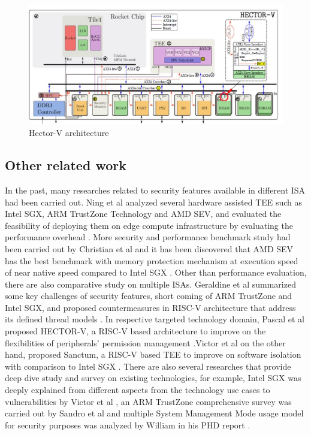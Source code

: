 \documentclass[]{rsos}%
\begin{document}
\begin{figure}[hbt!]
	\centering
	\includegraphics[width=1\textwidth]{figs/Hector.JPG}
	\caption{Hector-V architecture}
\end{figure}


\subsection{ Other related work}
In the past, many researches related to security features available in different ISA had been carried out.
Ning et al analyzed several hardware assisted TEE such as Intel SGX, ARM TrustZone Technology
and AMD SEV, and evaluated the feasibility of deploying them on edge compute infrastructure by evaluating the performance overhead \cite{R5:2}.
More security and performance benchmark study had been carried out by Christian et al and it has been discovered that AMD SEV has the best benchmark with memory protection mechanism at execution speed of near native speed compared to Intel SGX \cite{R5:3}.
Other than performance evaluation, there are also comparative study on multiple ISAs. Geraldine et
al summarized some key challenges of security features, short coming of ARM TrustZone and Intel SGX, and proposed countermeasures in RISC-V architecture that address its defined thread models \cite{R5:4}.
In respective targeted technology domain, Pascal et al proposed HECTOR-V, a RISC-V based architecture to improve on the flexibilities of peripherals’ permission management \cite{R5:5}.Victor et al on the other hand, proposed Sanctum, a RISC-V based TEE to improve on software isolation with comparison to Intel SGX  \cite{R5:6}. There are also several researches that provide deep dive study and survey on existing technologies, for example, Intel SGX was deeply explained from different aspects from the technology use cases to vulnerabilities by Victor et al \cite{R5:7}, an ARM TrustZone comprehensive survey was carried out by Sandro et al \cite{R5:8} and multiple System Management Mode usage model for security purposes was analyzed by William in his PHD report \cite{R5:9}.
\end{document}
